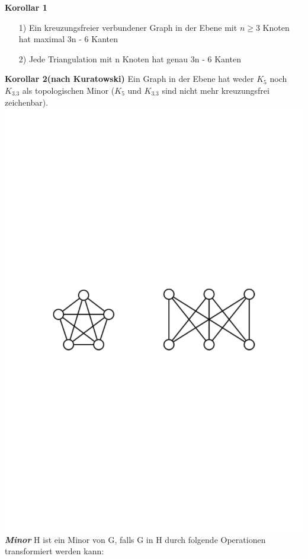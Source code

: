 \newpage
\textbf{Korollar 1}
\begin{itemize}
	\item[1)] Ein kreuzungsfreier verbundener Graph in der Ebene mit $n \ge 3$ Knoten hat maximal 3n - 6 Kanten
	\item[2)] Jede Triangulation mit n Knoten hat genau 3n - 6 Kanten 
\end{itemize}
\textbf{Korollar 2(nach Kuratowski)} \newline
Ein Graph in der Ebene hat weder $K_5$ noch $K_{3.3}$ als topologischen Minor ($K_5$ und $K_{3.3}$ sind nicht mehr kreuzungsfrei zeichenbar).\newline
\includegraphics[scale = 0.5]{lectures/161118/pix/K33+K5.pdf} \newline
\textbf{\textit{Minor}}\newline
H ist ein Minor von G, falls G in H durch folgende Operationen transformiert werden kann:
